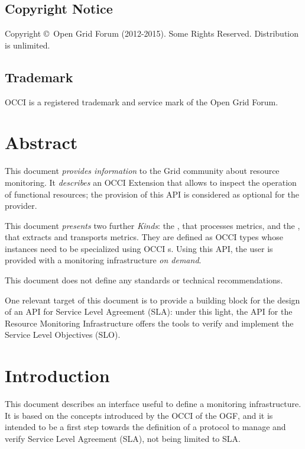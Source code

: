 \documentclass[12pt]{article}  %
\newcommand{\copyrightyears}{2012-2015}  %
\begin{document}
\subsection*{Copyright Notice}

Copyright \copyright \ Open Grid Forum (\copyrightyears).  Some Rights Reserved.  
Distribution is unlimited.

\subsection*{Trademark}

OCCI is a registered trademark and service mark of the Open Grid Forum. 

\section*{Abstract}

This document {\em provides information} to the Grid community about resource monitoring. It {\em describes} an OCCI Extension that allows to inspect the operation of functional resources; the provision of this API is considered as optional for the provider.

This document {\em presents} two further {\em Kinds}: the \sens, that processes metrics, and the \coll, that extracts and transports metrics. They are defined as OCCI types whose instances need to be specialized using OCCI \mi s. Using this API, the user is provided with a monitoring infrastructure {\em on demand}.

This document does not define any standards or technical recommendations.

One relevant target of this document is to provide a building block for the design of an API for Service Level Agreement (SLA): under this light, the API for the Resource Monitoring Infrastructure offers the tools to verify and implement the Service Level Objectives (SLO).

\tableofcontents

\newpage

\section{Introduction}

This document describes an interface useful to define a monitoring infrastructure. It is based on the concepts introduced by the OCCI of the OGF, and it is intended to be a first step towards the definition of a protocol to manage and verify Service Level Agreement (SLA), not being limited to SLA.
\end{document}
